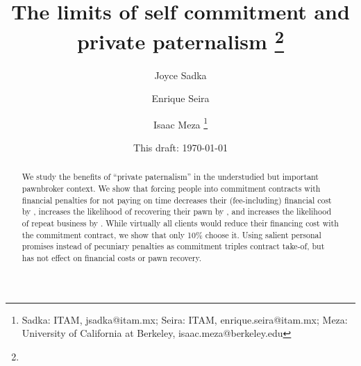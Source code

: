 \documentclass[11pt]{article}
\begin{document}
\title{The limits of self commitment and private paternalism \thanks{}}
\author{Joyce Sadka \and Enrique Seira \and Isaac Meza  \thanks{Sadka: ITAM, jsadka@itam.mx;  
Seira: ITAM, enrique.seira@itam.mx; Meza: University of California at Berkeley, isaac.meza@berkeley.edu} }
\date{This draft:  \today \\[2 cm]}



\maketitle
\begin{abstract}


We study the benefits of ``private paternalism'' in the understudied but important pawnbroker context. We show that forcing people into commitment contracts with financial penalties for not paying on time decreases their (fee-including) financial cost by , increases the likelihood of recovering their pawn by , and increases the likelihood of repeat business by . While virtually all clients would reduce their financing cost with the commitment contract, we show that only 10\% choose it. Using salient personal promises instead of pecuniary penalties as commitment triples contract take-of, but has not effect on financial costs or pawn recovery.


\end{abstract}
\end{document}
